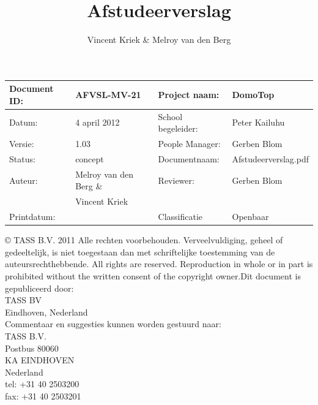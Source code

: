 \documentclass{article}
\makeatletter
\let\insertdate\@date
\newcommand{\version}{1.03}
\makeatother
\begin{document}
\title{Afstudeerverslag}
\author{Vincent Kriek \& Melroy van den Berg}

\maketitle

\vspace*{\fill}

\begin{tabular}{|| l | l || l | l ||}\hline
   Document ID: & AFVSL-MV-21          &Project naam:     &DomoTop             \\\hline
   Datum:       &4 april 2012          &School begeleider:&Peter Kailuhu       \\\hline
   Versie:      &\version              &People Manager:   &Gerben Blom         \\\hline
   Status:      &concept               &Documentnaam:     &Afstudeerverslag.pdf\\\hline
   Auteur:      &Melroy van den Berg \&&Reviewer:         &Gerben Blom         \\
                &Vincent Kriek         &                  &                    \\\hline
   Printdatum:  &\insertdate           &Classificatie     &Openbaar            \\\hline
\end{tabular}

\newpage

© TASS B.V. 2011
Alle rechten voorbehouden. Verveelvuldiging, geheel of gedeeltelijk, is
niet toegestaan dan met schriftelijke toestemming van de
auteursrechthebbende.
All rights are reserved. Reproduction in whole or in part is prohibited
without the written consent of the copyright owner.Dit document is
gepubliceerd door:\\
TASS BV\\
Eindhoven, Nederland\\

\noindent Commentaar en suggesties kunnen worden gestuurd naar:\\
\indent TASS B.V.\\
\indent\indent Postbus 80060\\
\indent{} KA  EINDHOVEN\\
\indent\indent Nederland\\
\indent\indent tel:  +31 40 2503200\\
\indent\indent fax:  +31 40 2503201\\
\end{document}
